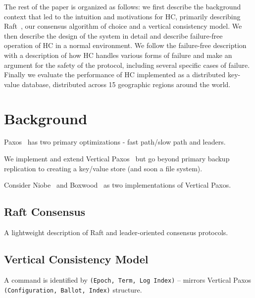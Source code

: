 \documentclass[10pt,twocolumn]{article}
\begin{document}
The rest of the paper is organized as follows: we first describe the
background context that led to the intuition and motivations for HC,
primarily describing Raft~\cite{raft}, our consensus algorithm of choice and
a vertical consistency model.
We then describe the design of the system in detail and describe failure-free
operation of HC in a normal environment.
We follow the failure-free description with a description of how HC handles
various forms of failure and make an argument for the safety of the protocol,
including several specific cases of failure.
Finally we evaluate the performance of HC implemented as a distributed
key-value database, distributed across 15 geographic regions around the
world.


\section*{Background}



Paxos~\cite{fast_paxos,multicoordinated_paxos,generalized_paxos,epaxos,spaxos}
has two primary optimizations - fast path/slow path and leaders.

We implement and extend Vertical Paxos~\cite{vertical_paxos} but go beyond
primary backup replication to creating a key/value store (and soon a file
system).

Consider Niobe~\cite{niobe} and Boxwood~\cite{boxwood} as two implementations
of Vertical Paxos.

\subsection*{Raft Consensus}

A lightweight description of Raft and leader-oriented consensus protocols.

\subsection*{Vertical Consistency Model}

A command is identified by \texttt{(Epoch, Term, Log Index)} -- mirrors
Vertical Paxos \texttt{(Configuration, Ballot, Index)} structure.
\end{document}
